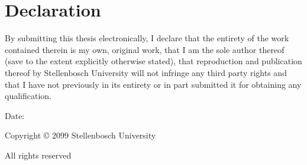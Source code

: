 \thispagestyle{plain}

\vspace*{5pt}

\section*{Declaration}

\vspace{20pt}

By submitting this thesis electronically, I declare that the entirety of the work contained
therein is my own, original work, that I am the sole author thereof (save to the extent explicitly
otherwise stated), that reproduction and publication thereof by Stellenbosch University will
not infringe any third party rights and that I have not previously in its entirety or in part
submitted it for obtaining any qualification.


\vspace{35pt}

\noindent Date: 

\vfill

\begin{center}
    Copyright © 2099 Stellenbosch University\par
    All rights reserved
\end{center}

